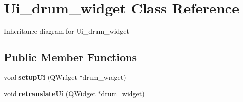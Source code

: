 \hypertarget{classUi__drum__widget}{}\section{Ui\+\_\+drum\+\_\+widget Class Reference}
\label{classUi__drum__widget}


Inheritance diagram for Ui\+\_\+drum\+\_\+widget\+:
\subsection*{Public Member Functions}
\begin{DoxyCompactItemize}
\item 
\mbox{\label{classUi__drum__widget_a44d72d490966380ff11780bb105189d8}} 
void {\bfseries setup\+Ui} (Q\+Widget $\ast$drum\+\_\+widget)
\item 
\mbox{\label{classUi__drum__widget_a7f7a0cdabd84bcfedc6eb48ada073fb2}} 
void {\bfseries retranslate\+Ui} (Q\+Widget $\ast$drum\+\_\+widget)
\end{DoxyCompactItemize}
